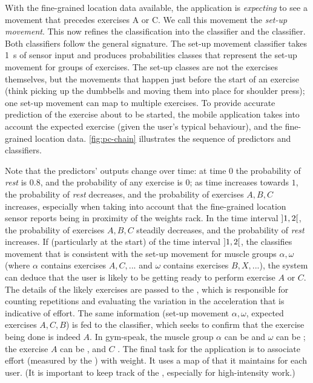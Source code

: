 With the fine-grained location data available, the application is \emph{expecting} to see a movement that precedes exercises A or C. We call this movement the \emph{set-up movement}. This now refines the classification into the  classifier and the  classifier. Both classifiers follow the general  signature. The set-up movement classifier takes \SI{1}{\second} of sensor input and produces probabilities classes that represent the set-up movement for groups of exercises. The set-up classes are not the exercises themselves, but the movements that happen just before the start of an exercise (think picking up the dumbbells and moving them into place for shoulder press); one set-up movement can map to multiple exercises. To provide accurate prediction of the exercise about to be started, the mobile application takes into account the expected exercise (given the user's typical behaviour), and the fine-grained location data. \autoref{fig:pc-chain} illustrates the sequence of predictors and classifiers.


Note that the predictors' outputs change over time: at time $0$ the probability of \emph{rest} is $0.8$, and the probability of any exercise is $0$; as time increases towards $1$, the probability of \emph{rest} decreases, and the probability of exercises ${A, B, C}$ increases, especially when taking into account that the fine-grained location sensor reports being in proximity of the weights rack. In the time interval $\interval[open]{1}{2}$, the probability of exercises ${A, B, C}$ steadily decreases, and the probability of \emph{rest} increases. If (particularly at the start) of the time interval $\interval[open]{1}{2}$, the  classifies movement that is consistent with the set-up movement for muscle groups ${\alpha, \omega}$ (where $\alpha$ contains exercises ${A, C, ...}$ and $\omega$ contains exercises ${B, X, ...}$), the system can deduce that the user is likely to be getting ready to perform exercise $A$ or $C$. The details of the likely exercises are passed to the , which is responsible for counting repetitions and evaluating the variation in the acceleration that is indicative of effort. The same information (set-up movement ${\alpha, \omega}$, expected exercises ${A, C, B}$) is fed to the  classifier, which seeks to confirm that the exercise being done is indeed $A$. In gym-speak, the muscle group $\alpha$ can be  and $\omega$ can be ; the exercise $A$ can be , and $C$ . The final task for the application is to associate effort (measured by the ) with weight. It uses a map of  that it maintains for each user. (It is important to keep track of the , especially for high-intensity work.)

